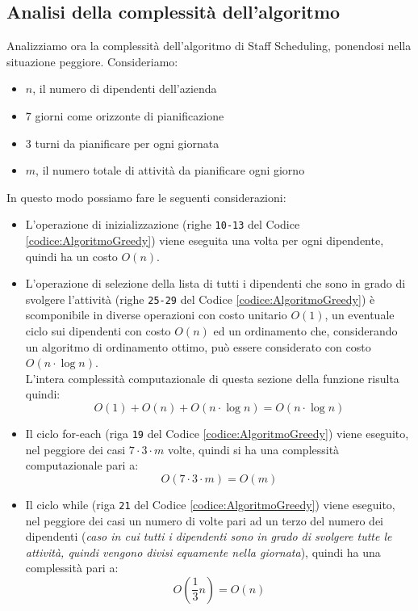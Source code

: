 \subsection{Analisi della complessità dell'algoritmo}
Analizziamo ora la complessità dell'algoritmo di Staff Scheduling, ponendosi nella situazione peggiore. Consideriamo:
\begin{itemize}
	\item $n$, il numero di dipendenti dell'azienda
	\item $7$ giorni come orizzonte di pianificazione
	\item $3$ turni da pianificare per ogni giornata
	\item $m$, il numero totale di attività da pianificare ogni giorno 
\end{itemize}
In questo modo possiamo fare le seguenti considerazioni:
\begin{itemize}
	\item L'operazione di inizializzazione (righe \verb|10-13| del Codice \ref{codice:AlgoritmoGreedy}) viene eseguita una volta per ogni dipendente, quindi ha un costo $O(n)$.
	\item L'operazione di selezione della lista di tutti i dipendenti che sono in grado di svolgere l'attività (righe \verb|25-29| del Codice \ref{codice:AlgoritmoGreedy}) è scomponibile in diverse operazioni con costo unitario $O(1)$, un eventuale ciclo sui dipendenti con costo $O(n)$ ed un ordinamento che, considerando un algoritmo di ordinamento ottimo, può essere considerato con costo $O(n\cdot \log{n})$.\\
		L'intera complessità computazionale di questa sezione della funzione risulta quindi:
		\begin{equation}
			O(1)+O(n)+O(n\cdot \log{n})=O(n\cdot \log{n})
		\end{equation}
	\item Il ciclo for-each (riga \verb|19| del Codice \ref{codice:AlgoritmoGreedy}) viene eseguito, nel peggiore dei casi $7\cdot 3 \cdot m$ volte, quindi si ha una complessità computazionale pari a:
		\begin{equation}
			O(7 \cdot 3 \cdot m) = O(m)
		\end{equation}
	\item Il ciclo while (riga \verb|21| del Codice \ref{codice:AlgoritmoGreedy}) viene eseguito, nel peggiore dei casi un numero di volte pari ad un terzo del numero dei dipendenti (\textit{caso in cui tutti i dipendenti sono in grado di svolgere tutte le attività, quindi vengono divisi equamente nella giornata}), quindi ha una complessità pari a:
		\begin{equation}
			O\left( \dfrac{1}{3} n \right) = O(n)
		\end{equation}
\end{itemize}
